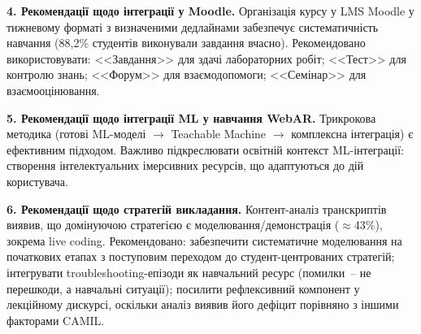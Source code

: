 \textbf{4. Рекомендації щодо інтеграції у Moodle.} Організація курсу у LMS Moodle у тижневому форматі з визначеними дедлайнами забезпечує систематичність навчання (88,2\% студентів виконували завдання вчасно). Рекомендовано використовувати: <<Завдання>> для здачі лабораторних робіт; <<Тест>> для контролю знань; <<Форум>> для взаємодопомоги; <<Семінар>> для взаємооцінювання.

\textbf{5. Рекомендації щодо інтеграції ML у навчання WebAR.} Трикрокова методика (готові ML-моделі $\to$ Teachable Machine $\to$ комплексна інтеграція) є ефективним підходом. Важливо підкреслювати освітній контекст ML-інтеграції: створення інтелектуальних імерсивних ресурсів, що адаптуються до дій користувача.

\textbf{6. Рекомендації щодо стратегій викладання.} Контент-аналіз транскриптів виявив, що домінуючою стратегією є моделювання/демонстрація ($\approx$43\%), зокрема live coding. Рекомендовано: забезпечити систематичне моделювання на початкових етапах з поступовим переходом до студент-центрованих стратегій; інтегрувати troubleshooting-епізоди як навчальний ресурс (помилки~-- не перешкоди, а навчальні ситуації); посилити рефлексивний компонент у лекційному дискурсі, оскільки аналіз виявив його дефіцит порівняно з іншими факторами CAMIL.
